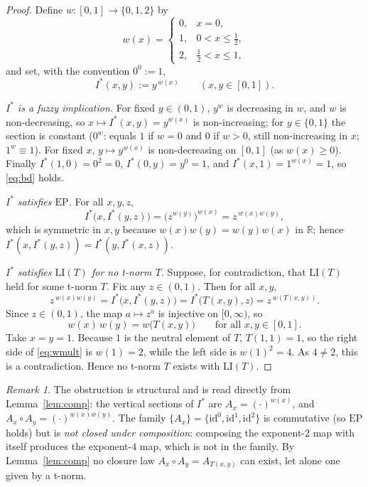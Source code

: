 \documentclass{amsart}
\theoremstyle{definition}
\theoremstyle{remark}
\newtheorem{remark}{Remark}
\newcommand{\zo}{[0,1]}
\newcommand{\LI}{\mathrm{LI}}
\newcommand{\EP}{\mathrm{EP}}
\newcommand{\Ax}{A}
\begin{document}
\begin{proof}
Define $w\colon\zo\to\{0,1,2\}$ by
\[
w(x)=\begin{cases}0,& x=0,\\ 1,& 0<x\le\tfrac12,\\ 2,& \tfrac12<x\le1,\end{cases}
\]
and set, with the convention $0^{0}:=1$,
\begin{equation}\label{eq:Istar}
I^{\ast}(x,y):=y^{\,w(x)}\qquad(x,y\in\zo).
\end{equation}

\emph{$I^{\ast}$ is a fuzzy implication.} For fixed $y\in(0,1)$, $y^{w}$ is decreasing in
$w$, and $w$ is non-decreasing, so $x\mapsto I^{\ast}(x,y)=y^{w(x)}$ is non-increasing;
for $y\in\{0,1\}$ the section is constant ($0^{w}$: equals $1$ if $w=0$ and $0$ if $w>0$,
still non-increasing in $x$; $1^{w}\equiv1$). For fixed $x$, $y\mapsto y^{w(x)}$ is
non-decreasing on $\zo$ (as $w(x)\ge0$). Finally $I^{\ast}(1,0)=0^{2}=0$,
$I^{\ast}(0,y)=y^{0}=1$, and $I^{\ast}(x,1)=1^{w(x)}=1$, so \eqref{eq:bd} holds.

\emph{$I^{\ast}$ satisfies $\EP$.} For all $x,y,z$,
\[
I^{\ast}\bigl(x,I^{\ast}(y,z)\bigr)=\bigl(z^{w(y)}\bigr)^{w(x)}=z^{\,w(x)w(y)},
\]
which is symmetric in $x,y$ because $w(x)w(y)=w(y)w(x)$ in $\mathbb{R}$; hence
$I^{\ast}(x,I^{\ast}(y,z))=I^{\ast}(y,I^{\ast}(x,z))$.

\emph{$I^{\ast}$ satisfies $\LI(T)$ for no t-norm $T$.} Suppose, for contradiction, that
$\LI(T)$ held for some t-norm $T$. Fix any $z\in(0,1)$. Then for all $x,y$,
\[
z^{\,w(x)w(y)}=I^{\ast}\bigl(x,I^{\ast}(y,z)\bigr)=I^{\ast}\bigl(T(x,y),z\bigr)
=z^{\,w(T(x,y))}.
\]
Since $z\in(0,1)$, the map $a\mapsto z^{a}$ is injective on $[0,\infty)$, so
\begin{equation}\label{eq:wmult}
w(x)\,w(y)=w\bigl(T(x,y)\bigr)\qquad\text{for all }x,y\in\zo.
\end{equation}
Take $x=y=1$. Because $1$ is the neutral element of $T$, $T(1,1)=1$, so the right side of
\eqref{eq:wmult} is $w(1)=2$, while the left side is $w(1)^{2}=4$. As $4\ne2$, this is a
contradiction. Hence no t-norm $T$ exists with $\LI(T)$.
\end{proof}

\begin{remark}
The obstruction is structural and is read directly from Lemma~\ref{lem:comp}: the vertical
sections of $I^{\ast}$ are $\Ax_x=(\cdot)^{w(x)}$, and $\Ax_x\circ\Ax_y=(\cdot)^{w(x)w(y)}$.
The family $\{\Ax_x\}=\{\mathrm{id}^{0},\mathrm{id}^{1},\mathrm{id}^{2}\}$ is commutative
(so $\EP$ holds) but is \emph{not closed under composition}: composing the exponent-$2$ map
with itself produces the exponent-$4$ map, which is not in the family. By
Lemma~\ref{lem:comp} no closure law $\Ax_x\circ\Ax_y=\Ax_{T(x,y)}$ can exist, let alone
one given by a t-norm.
\end{remark}
\end{document}
